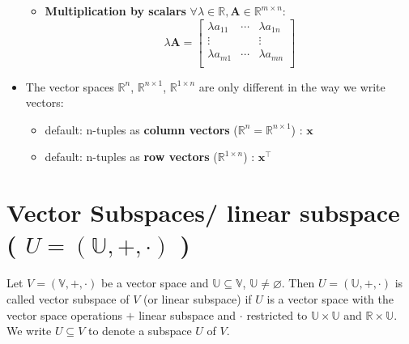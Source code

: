 \begin{itemize}
\begin{itemize}
        \item \textbf{Multiplication by scalars} $\forall \lambda\in\mathbb{R}, \mathbf{A}\in\mathbb{R}^{m\times n}$:
        \[
            \lambda\mathbf{A} = \begin{bmatrix}
                \lambda a_{11} & \cdots & \lambda a_{1n} \\
                \vdots & & \vdots \\
                \lambda a_{m1} & \cdots & \lambda a_{mn} \\
            \end{bmatrix}
        \]
    \end{itemize}

    \item The vector spaces $\mathbb{R}^n$, $\mathbb{R}^{n\times 1}$, $\mathbb{R}^{1\times n}$ are only different in the way we write vectors:
    \begin{itemize}
        \item default: n-tuples as \textbf{column vectors} ($\mathbb{R}^n = \mathbb{R}^{n \times 1}$) : $\mathbf{x}$

        \item default: n-tuples as \textbf{row vectors} ($\mathbb{R}^{1 \times n}$) : $\mathbf{x}^\top$
    \end{itemize}
\end{itemize}


\section{Vector Subspaces/ linear subspace ( $U = (\mathbb{U}, +, \cdot)$ ) \cite{mfml-1}}\label{Vector Subspaces/ linear subspace}
Let $V = (\mathbb{V}, +, \cdot)$ be a vector space and $\mathbb{U} \subseteq \mathbb{V}$, $\mathbb{U} \neq \varnothing$. Then $U = (\mathbb{U}, +, \cdot)$ is called vector subspace of $V$ (or linear subspace) if $U$ is a vector space with the vector space operations $+$ linear subspace and $\cdot$ restricted to $\mathbb{U} \times \mathbb{U}$ and $\mathbb{R} \times \mathbb{U}$. We write $U \subseteq V$ to denote a subspace $U$ of $V$.

